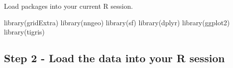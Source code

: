 \documentclass[
]{book}
\newenvironment{Shaded}{\begin{snugshade}}{\end{snugshade}}
\newcommand{\FunctionTok}[1]{\textcolor[rgb]{0.00,0.00,0.00}{#1}}
\newcommand{\NormalTok}[1]{#1}
\begin{document}
Load packages into your current R session.

\begin{Shaded}
\begin{Highlighting}[]
\FunctionTok{library}\NormalTok{(gridExtra)}
\FunctionTok{library}\NormalTok{(nngeo)}
\FunctionTok{library}\NormalTok{(sf)}
\FunctionTok{library}\NormalTok{(dplyr)}
\FunctionTok{library}\NormalTok{(ggplot2)}
\FunctionTok{library}\NormalTok{(tigris)}
\end{Highlighting}
\end{Shaded}

\hypertarget{step-2---load-the-data-into-your-r-session}{%
\subsection{Step 2 - Load the data into your R session}\label{step-2---load-the-data-into-your-r-session}}
\end{document}
